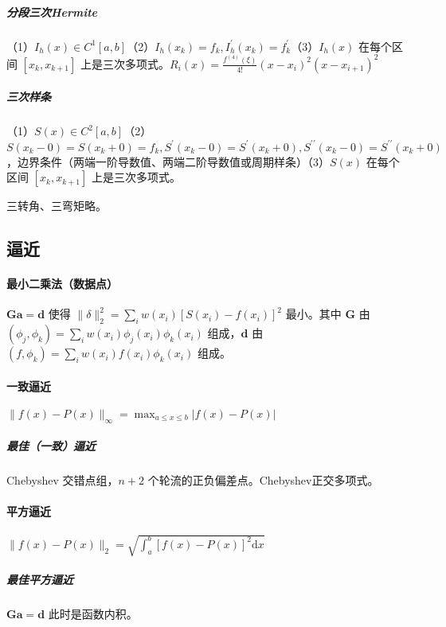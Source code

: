 \documentclass[twocolumn]{ctexart}
\def\dd{\mathrm{d}}
\begin{document}

\subparagraph{分段三次Hermite}（1）$I_h(x)\in C^1[a,b]$（2）$I_h(x_k)=f_k,I_h^\prime (x_k)=f_k^\prime$（3）$I_h(x)$ 在每个区间 $[x_k,x_{k+1}]$ 上是三次多项式。$R_i(x)=\frac{f^{(4)}(\xi)}{4!}(x-x_i)^2(x-x_{i+1})^2$

\subparagraph{三次样条}（1）$S(x)\in C^2[a,b]$（2）$S(x_k-0)=S(x_k+0)=f_k,S^\prime (x_k-0)=S^\prime (x_k+0), S^{\prime\prime}(x_k-0)=S^{\prime\prime}(x_k+0)$，边界条件（两端一阶导数值、两端二阶导数值或周期样条）（3）$S(x)$ 在每个区间 $[x_k,x_{k+1}]$ 上是三次多项式。

三转角、三弯矩略。


\subsection{逼近}

\paragraph{最小二乘法（数据点）} $\mathbf{G}\mathbf{a}=\mathbf{d}$ 使得 $\lVert\delta\rVert_2^2=\sum_{i}w(x_i)[S(x_i)-f(x_i)]^2$ 最小。其中 $\mathbf{G}$ 由 $(\phi_j,\phi_k)=\sum_{i}w(x_i)\phi_j(x_i)\phi_k(x_i)$ 组成，$\mathbf{d}$ 由 $(f,\phi_k)=\sum_{i}w(x_i)f(x_i)\phi_k(x_i)$ 组成。

\paragraph{一致逼近} $\lVert f(x)-P(x)\rVert_\infty=\max_{a\leq x\leq b}|f(x)-P(x)|$
\subparagraph{最佳（一致）逼近} Chebyshev 交错点组，$n+2$ 个轮流的正负偏差点。Chebyshev正交多项式。

\paragraph{平方逼近} $\lVert f(x)-P(x)\rVert_2=\sqrt{\int_{a}^b[f(x)-P(x)]^2\dd x}$
\subparagraph{最佳平方逼近} $\mathbf{G}\mathbf{a}=\mathbf{d}$ 此时是函数内积。%
\end{document}
